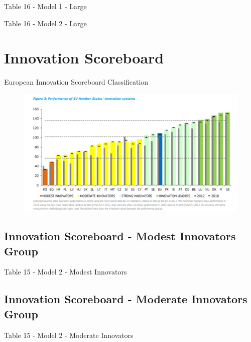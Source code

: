 \documentclass{beamer}					%
\begin{document}
	\begin{frame}{Table 16 - Model 1 - Large}
		
	\end{frame}	

	\begin{frame}{Table 16 - Model 2 - Large}
		
	\end{frame}	

	\section{Innovation Scoreboard}
	
	\begin{frame}{European Innovation Scoreboard Classification}
		\begin{figure}[H]
			\centering
			\includegraphics[width=1.\textwidth]{InnovationScoreboard.png}
			\label{fig:figure1}
		\end{figure}
	\end{frame}
	
	\subsection{Innovation Scoreboard - Modest Innovators Group}
	
	\begin{frame}{Table 15 - Model 2 - Modest Innovators}
		
	\end{frame}

	\subsection{Innovation Scoreboard - Moderate Innovators Group}

	\begin{frame}{Table 15 - Model 2 - Moderate Innovators}
		
	\end{frame}
\end{document}
